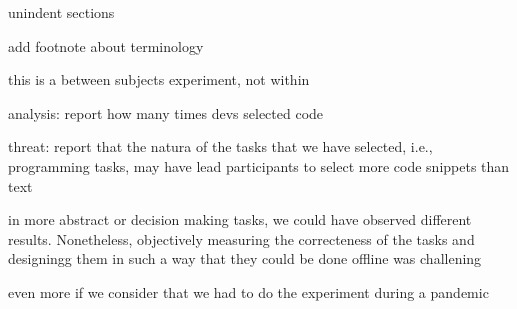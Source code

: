 unindent sections


add footnote about terminology


this is a between subjects experiment, not within 



analysis: report how many times devs selected code

threat: report that the natura of the tasks that we have selected, i.e., programming tasks, may have lead participants to select more code snippets than text

in more abstract or decision making tasks, we could have observed different results. Nonetheless, objectively measuring the correcteness of the tasks and designingg them in such a way that they could be done offline was challening

even more if we consider that we had to do the experiment during a pandemic

\clearpage




























